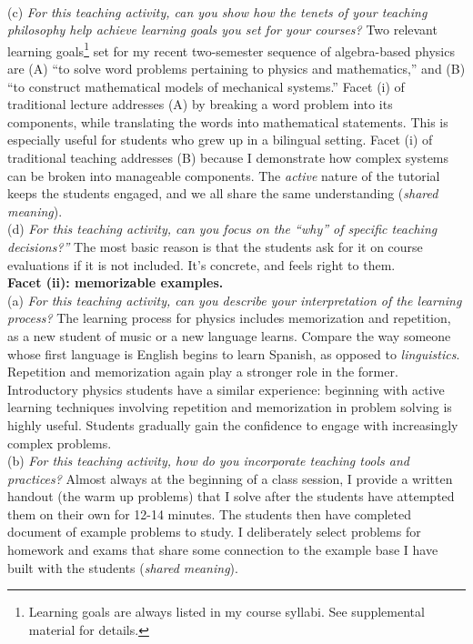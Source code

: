 \documentclass[../../../main.tex]{subfiles}
\begin{document}
\\
\vspace{0.25cm}
(c) \textit{For this teaching activity, can you show how the tenets of your teaching philosophy help achieve learning goals you set for your courses?} Two relevant learning goals\footnote{Learning goals are always listed in my course syllabi.  See supplemental material for details.} set for my recent two-semester sequence of algebra-based physics are (A) ``to solve word problems pertaining to physics and mathematics,'' and (B) ``to construct mathematical models of mechanical systems.''  Facet (i) of traditional lecture addresses (A) by breaking a word problem into its components, while translating the words into mathematical statements.  This is especially useful for students who grew up in a bilingual setting.  Facet (i) of traditional teaching addresses (B) because I demonstrate how complex systems can be broken into manageable components.  The \textit{active} nature of the tutorial keeps the students engaged, and we all share the same understanding (\textit{shared meaning}).
\\
\vspace{0.25cm}
(d) \textit{For this teaching activity, can you focus on the ``why'' of specific teaching decisions?''}  The most basic reason is that the students ask for it on course evaluations if it is not included.  It's concrete, and feels right to them.
\\
\vspace{0.25cm}
\textbf{Facet (ii): memorizable examples.}
\\
\vspace{0.25cm}
(a) \textit{For this teaching activity, can you describe your interpretation of the learning process?}  The learning process for physics includes memorization and repetition, as a new student of music or a new language learns.  Compare the way someone whose first language is English begins to learn Spanish, as opposed to \textit{linguistics}.  Repetition and memorization again play a stronger role in the former.  Introductory physics students have a similar experience: beginning with active learning techniques involving repetition and memorization in problem solving is highly useful.  Students gradually gain the confidence to engage with increasingly complex problems.
\\
\vspace{0.25cm}
(b) \textit{For this teaching activity, how do you incorporate teaching tools and practices?}  Almost always at the beginning of a class session, I provide a written handout (the warm up problems) that I solve after the students have attempted them on their own for 12-14 minutes.  The students then have completed document of example problems to study.  I deliberately select problems for homework and exams that share some connection to the example base I have built with the students (\textit{shared meaning}).
\end{document}
